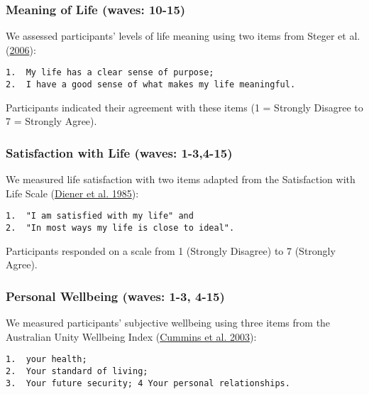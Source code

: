 \documentclass[
  singlecolumn]{report}
\begin{document}
\hypertarget{meaning-of-life-waves-10-15}{%
\subsubsection{Meaning of Life (waves:
10-15)}\label{meaning-of-life-waves-10-15}}

We assessed participants' levels of life meaning using two items from
Steger et al. (\protect\hyperlink{ref-steger_meaning_2006}{2006}):

\begin{verbatim}
1.  My life has a clear sense of purpose;
2.  I have a good sense of what makes my life meaningful.
\end{verbatim}

Participants indicated their agreement with these items (1 = Strongly
Disagree to 7 = Strongly Agree).

\hypertarget{satisfaction-with-life-waves-1-34-15}{%
\subsubsection{Satisfaction with Life (waves:
1-3,4-15)}\label{satisfaction-with-life-waves-1-34-15}}

We measured life satisfaction with two items adapted from the
Satisfaction with Life Scale (\protect\hyperlink{ref-diener1985}{Diener
et al. 1985}):

\begin{verbatim}
1.  "I am satisfied with my life" and
2.  "In most ways my life is close to ideal".
\end{verbatim}

Participants responded on a scale from 1 (Strongly Disagree) to 7
(Strongly Agree).

\hypertarget{personal-wellbeing-waves-1-3-4-15}{%
\subsubsection{Personal Wellbeing (waves: 1-3,
4-15)}\label{personal-wellbeing-waves-1-3-4-15}}

We measured participants' subjective wellbeing using three items from
the Australian Unity Wellbeing Index
(\protect\hyperlink{ref-cummins_developing_2003}{Cummins et al. 2003}):

\begin{verbatim}
1.  your health;
2.  Your standard of living;
3.  Your future security; 4 Your personal relationships.
\end{verbatim}
\end{document}
